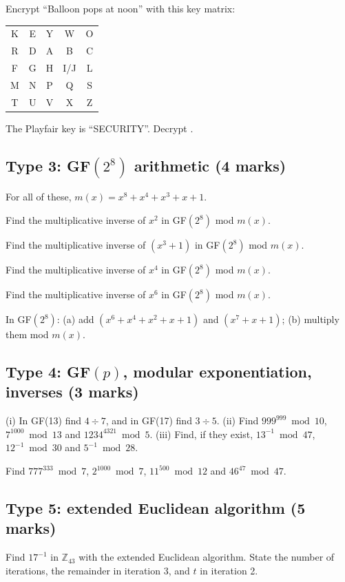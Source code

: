  Encrypt ``Balloon pops at noon'' with this key matrix:
\begin{center}\small\ttfamily
\begin{tabular}{ccccc}K&E&Y&W&O\\R&D&A&B&C\\F&G&H&I/J&L\\M&N&P&Q&S\\T&U&V&X&Z\end{tabular}
\end{center}

 The Playfair key is ``SECURITY''. Decrypt .

\subsection*{Type 3: GF$(2^8)$ arithmetic (4 marks)}
For all of these, $m(x) = x^8 + x^4 + x^3 + x + 1$.

 Find the multiplicative inverse of $x^2$ in GF$(2^8)$ mod $m(x)$.

 Find the multiplicative inverse of $(x^3 + 1)$ in GF$(2^8)$ mod $m(x)$.

 Find the multiplicative inverse of $x^4$ in GF$(2^8)$ mod $m(x)$.

 Find the multiplicative inverse of $x^6$ in GF$(2^8)$ mod $m(x)$.

 In GF$(2^8)$: (a) add $(x^6 + x^4 + x^2 + x + 1)$ and $(x^7 + x + 1)$; (b) multiply them mod $m(x)$.

\subsection*{Type 4: GF$(p)$, modular exponentiation, inverses (3 marks)}
 (i) In GF(13) find $4 \div 7$, and in GF(17) find $3 \div 5$.
(ii) Find $999^{999} \bmod 10$, $7^{1000} \bmod 13$ and $1234^{4321} \bmod 5$.
(iii) Find, if they exist, $13^{-1} \bmod 47$, $12^{-1} \bmod 30$ and $5^{-1} \bmod 28$.

 Find $777^{333} \bmod 7$, $2^{1000} \bmod 7$, $11^{500} \bmod 12$ and $46^{47} \bmod 47$.

\subsection*{Type 5: extended Euclidean algorithm (5 marks)}
 Find $17^{-1}$ in $\mathbb{Z}_{43}$ with the extended Euclidean algorithm. State the number of iterations, the remainder in iteration 3, and $t$ in iteration 2.

